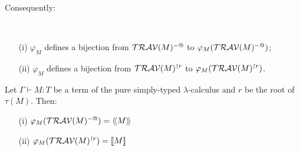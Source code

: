 Consequently:
\begin{cor} \
\label{cor:varphi_bij}
\begin{itemize}
\item[(i)] $\varphi_M$ defines a bijection from $\mathcal{TRAV}(M)^{-@}$
to $\varphi_M(\mathcal{TRAV}(M)^{-@})$;
\item[(ii)] $\varphi_M$ defines a bijection from $\mathcal{TRAV}(M)^{\upharpoonright r}$ to
$\varphi_M(\mathcal{TRAV}(M)^{\upharpoonright r})$.
\end{itemize}
\end{cor}






\begin{prop}
\label{prop:rel_gamesem_trav_closed} Let $\Gamma \vdash M : T$ be a
term of the pure simply-typed $\lambda$-calculus and $r$ be the root
of $\tau(M)$. Then:
\begin{itemize}
\item[(i)]  $\varphi_M(\mathcal{TRAV}(M)^{-@}) = {\langle\!\langle M \rangle\!\rangle}$
\item[(ii)] $\varphi_M(\mathcal{TRAV}(M)^{\upharpoonright r}) = {[\![ M ]\!]}$
\end{itemize}
\end{prop}


